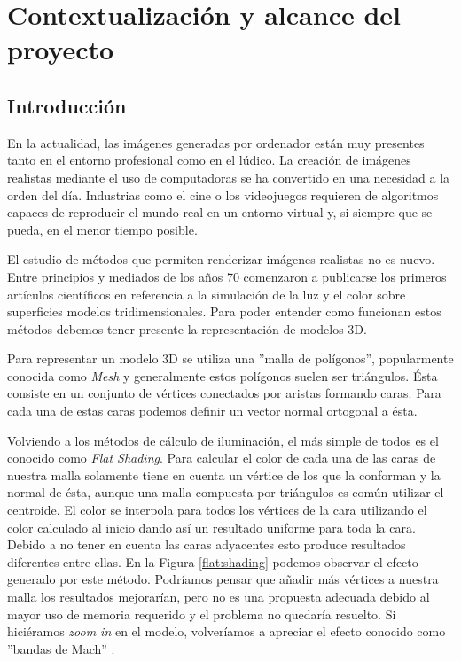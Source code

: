 \documentclass[titlepage,12pt]{report}
\begin{document}
\iftrue

\newpage
\tableofcontents*
\fi

\newpage

\chapter{Contextualización y alcance del proyecto}

\section{Introducción} \label{introduction}

En la actualidad, las imágenes generadas por ordenador están muy presentes tanto en el entorno profesional como en el lúdico. La creación de imágenes realistas mediante el uso de computadoras se ha convertido en una necesidad a la orden del día. Industrias como el cine o los videojuegos requieren de algoritmos capaces de reproducir el mundo real en un entorno virtual y, si siempre que se pueda, en el menor tiempo posible.

El estudio de métodos que permiten renderizar imágenes realistas no es nuevo. Entre principios y mediados de los años 70 comenzaron a publicarse los primeros artículos científicos en referencia a la simulación de la luz y el color sobre superficies modelos tridimensionales. Para poder entender como funcionan estos métodos debemos tener presente la representación de modelos 3D. 

Para representar un modelo 3D se utiliza una ''malla de polígonos'', popularmente conocida como \textit{Mesh} y generalmente estos polígonos suelen ser triángulos. Ésta consiste en un conjunto de vértices conectados por aristas formando caras. Para cada una de estas caras podemos definir un vector normal ortogonal a ésta.

Volviendo a los métodos de cálculo de iluminación, el más simple de todos es el conocido como \textit{Flat Shading}. Para calcular el color de cada una de las caras de nuestra malla solamente tiene en cuenta un vértice de los que la conforman y la normal de ésta, aunque una malla compuesta por triángulos es común utilizar el centroide. El color se interpola para todos los vértices de la cara utilizando el color calculado al inicio dando así un resultado uniforme para toda la cara. Debido a no tener en cuenta las caras adyacentes esto produce resultados diferentes entre ellas. En la Figura \ref{flat:shading} podemos observar el efecto generado por este método. Podríamos pensar que añadir más vértices a nuestra malla los resultados mejorarían, pero no es una propuesta adecuada debido al mayor uso de memoria requerido y el problema no quedaría resuelto. Si hiciéramos \textit{zoom in} en el modelo, volveríamos a apreciar el efecto conocido como ''bandas de Mach'' \cite{Lotto1999}.
\end{document}
